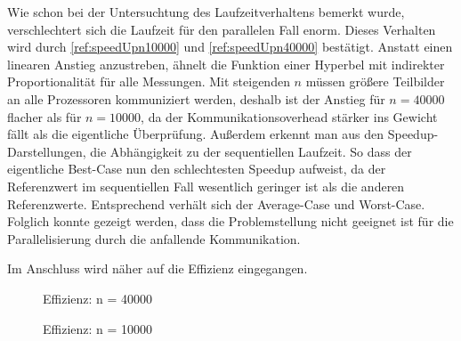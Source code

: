 Wie schon bei der Untersuchtung des Laufzeitverhaltens bemerkt wurde, verschlechtert sich die Laufzeit für den parallelen Fall enorm. 
Dieses Verhalten wird durch \autoref{ref:speedUpn10000} und \autoref{ref:speedUpn40000} bestätigt. 
Anstatt einen linearen Anstieg anzustreben, ähnelt die Funktion einer Hyperbel mit indirekter Proportionalität für alle Messungen. 
Mit steigenden $n$ müssen größere Teilbilder an alle Prozessoren kommuniziert werden, deshalb ist der Anstieg für $n=40000$ flacher als für $n=10000$, da der Kommunikationsoverhead stärker ins Gewicht fällt als die eigentliche Überprüfung. 
Außerdem erkennt man aus den Speedup-Darstellungen, die Abhängigkeit zu der sequentiellen Laufzeit. 
So dass der eigentliche Best-Case nun den schlechtesten Speedup aufweist, da der Referenzwert im sequentiellen Fall wesentlich geringer ist als die anderen Referenzwerte. 
Entsprechend verhält sich der Average-Case und Worst-Case. Folglich konnte gezeigt werden, dass die Problemstellung nicht geeignet ist für die Parallelisierung durch die anfallende Kommunikation. 

Im Anschluss wird näher auf die Effizienz eingegangen.
\begin{figure}[!ht]
\begin{minipage}{0.49\textwidth}
	\caption{Effizienz: n = 40000}
	\label{ref:Effizienzn40000}
\end{minipage}
\hfill
\begin{minipage}{0.49\textwidth}
	\caption{Effizienz: n = 10000}
	\label{ref:Effizienzn10000}
\end{minipage}
\end{figure}

